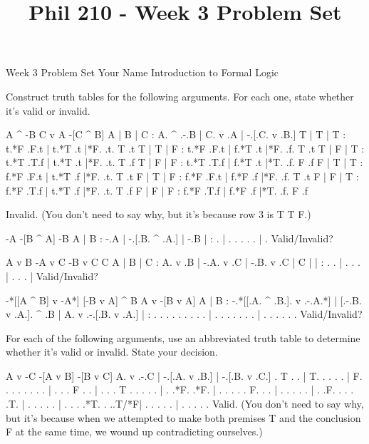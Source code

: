 
\title{Phil 210 - Week 3 Problem Set}

\heading
Week 3 Problem Set
Your Name
Introduction to Formal Logic
\endheading

Construct truth tables for the following arguments. For each one, state whether it's valid or invalid.

\problems
{}
\argument
 A ^ -B
 C v A
\argumentline
 -[C ^ B]
\endargument
	\answer
	\truthtable
	 A | B | C : A. ^ .-.B | C. v .A | -.[.C. v .B.]
	\truthtableline
	 T | T | T : t.*F .F.t | t.*T .t |*F. .t. T .t
	 T | T | F : t.*F .F.t | f.*T .t |*F. .f. T .t
	 T | F | T : t.*T .T.f | t.*T .t |*F. .t. T .f
	 T | F | F : t.*T .T.f | f.*T .t |*T. .f. F .f
	 F | T | T : f.*F .F.t | t.*T .f |*F. .t. T .t
	 F | T | F : f.*F .F.t | f.*F .f |*F. .f. T .t
	 F | F | T : f.*F .T.f | t.*T .f |*F. .t. T .f
	 F | F | F : f.*F .T.f | f.*F .f |*T. .f. F .f
	\endtruthtable

	Invalid. (You don't need to say why, but it's because row 3 is T T F.)
	\endanswer

\argument
 -A
 -[B ^ A]
\argumentline
 -B
\endargument
	\answer
	\truthtable
	 A | B : -.A | -.[.B. ^ .A.] | -.B
	\truthtableline
	   |   :  .  |  . . .   . .  |  . 
	\endtruthtable
	Valid/Invalid?
	\endanswer

\argument
 A v B
 -A v C
 -B v C
\argumentline
 C
\endargument
	\answer
	\truthtable
	 A | B | C : A. v .B | -.A. v .C | -.B. v .C | C
	\truthtableline
	   |   |   :  .   .  |  . .   .  |  . .   .  |  
	\endtruthtable
	Valid/Invalid?
	\endanswer

\argument
 -*[[A ^ B] v -A*]
 [-B v A] ^ B
\argumentline
 A v -[B v A]
\endargument
	\answer
	\truthtable
	 A | B : -.*[[.A. ^ .B.]. v .-.A.*] | [.-.B. v .A.]. ^ .B | A. v .-.[.B. v .A.]
	\truthtableline
	   |   :  .   . .   . . .   . . .   |  . . .   . . .   .  |  .   . . . .   . 
	\endtruthtable
	Valid/Invalid?
	\endanswer
\endproblems

For each of the following arguments, use an abbreviated truth table to determine whether it's valid or invalid. State your decision.

\problems
{}
\argument
 A v -C
 -[A v B]
\argumentline
 -[B v C]
\endargument
	\answer
	\truthtable
	 A. v .-.C | -.[.A. v .B.] | -.[.B. v .C.]
	\truthtableline
	  . T . .  | T. . .   . .  | F. . .   . .
	  .   . .  |  . . . F . .  |  . . . T . .
	  .   . .  |  . .*F.  .*F. |  . . .   . .
	 F.   . .  |  . . .   . .  |  . .F.   . .
	  .   .T.  |  . . .   . .  |  . . .   .*T.
	  .  ..T/*F|  . . .   . .  |  . . .   . .
	\endtruthtable
	Valid. (You don't need to say why, but it's because when we attempted to make both premises T and the conclusion F at the same time, we wound up contradicting ourselves.)
	\endanswer

